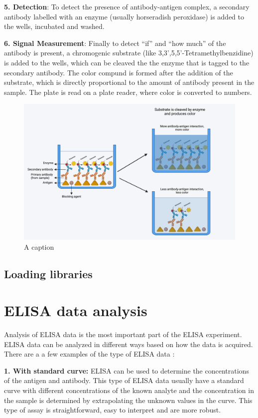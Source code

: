 \documentclass[
]{book}
\begin{document}
\textbf{5. Detection}: To detect the presence of antibody-antigen complex, a secondary antibody labelled with an enzyme (usually horseradish peroxidase) is added to the wells, incubated and washed.

\textbf{6. Signal Measurement}: Finally to detect ``if'' and ``how much'' of the antibody is present, a chromogenic substrate (like 3,3',5,5'-Tetramethylbenzidine) is added to the wells, which can be cleaved the the enzyme that is tagged to the secondary antibody. The color compund is formed after the addition of the substrate, which is directly proportional to the amount of antibody present in the sample. The plate is read on a plate reader, where color is converted to numbers.

\begin{figure}
\includegraphics[width=1\linewidth]{DATA/elisa} \caption{A caption}\label{fig:pressure}
\end{figure}

\subsection{Loading libraries}\label{loading-libraries}

\section{ELISA data analysis}\label{elisa-data-analysis}

Analysis of ELISA data is the most important part of the ELISA experiment. ELISA data can be analyzed in different ways based on how the data is acquired. There are a a few examples of the type of ELISA data :

\textbf{1. With standard curve:} ELISA can be used to determine the concentrations of the antigen and antibody. This type of ELISA data usually have a standard curve with
different concentrations of the known analyte and the concentration in the sample is determined by extrapolating the unknown values in the curve. This type of assay is straightforward, easy to interpret and are more robust.
\end{document}
